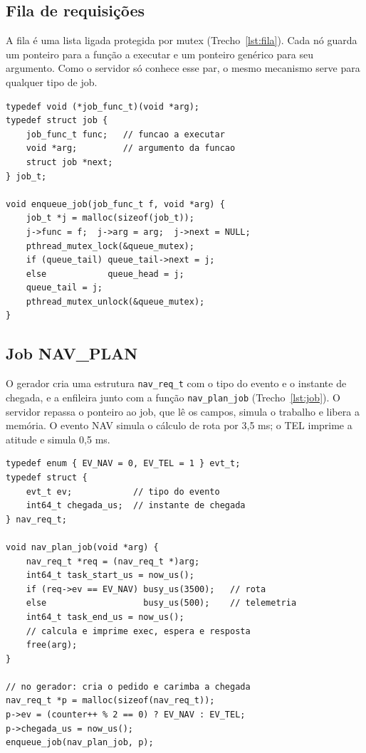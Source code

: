 \documentclass[conference,a4paper]{IEEEtran}
\begin{document}
\subsection{Fila de requisições}
A fila é uma lista ligada protegida por mutex (Trecho~\ref{lst:fila}). Cada nó guarda um ponteiro para a função a executar e um ponteiro genérico para seu argumento. Como o servidor só conhece esse par, o mesmo mecanismo serve para qualquer tipo de job.

\begin{lstlisting}[caption={Fila de jobs, do código de exemplo.},label={lst:fila}]
typedef void (*job_func_t)(void *arg);
typedef struct job {
    job_func_t func;   // funcao a executar
    void *arg;         // argumento da funcao
    struct job *next;
} job_t;

void enqueue_job(job_func_t f, void *arg) {
    job_t *j = malloc(sizeof(job_t));
    j->func = f;  j->arg = arg;  j->next = NULL;
    pthread_mutex_lock(&queue_mutex);
    if (queue_tail) queue_tail->next = j;
    else            queue_head = j;
    queue_tail = j;
    pthread_mutex_unlock(&queue_mutex);
}
\end{lstlisting}

\subsection{Job NAV\_PLAN}
O gerador cria uma estrutura \texttt{nav\_req\_t} com o tipo do evento e o instante de chegada, e a enfileira junto com a função \texttt{nav\_plan\_job} (Trecho~\ref{lst:job}). O servidor repassa o ponteiro ao job, que lê os campos, simula o trabalho e libera a memória. O evento NAV simula o cálculo de rota por 3,5 ms; o TEL imprime a atitude e simula 0,5 ms.

\begin{lstlisting}[caption={Argumento, job NAV\_PLAN e geração do pedido.},label={lst:job}]
typedef enum { EV_NAV = 0, EV_TEL = 1 } evt_t;
typedef struct {
    evt_t ev;            // tipo do evento
    int64_t chegada_us;  // instante de chegada
} nav_req_t;

void nav_plan_job(void *arg) {
    nav_req_t *req = (nav_req_t *)arg;
    int64_t task_start_us = now_us();
    if (req->ev == EV_NAV) busy_us(3500);   // rota
    else                   busy_us(500);    // telemetria
    int64_t task_end_us = now_us();
    // calcula e imprime exec, espera e resposta
    free(arg);
}

// no gerador: cria o pedido e carimba a chegada
nav_req_t *p = malloc(sizeof(nav_req_t));
p->ev = (counter++ % 2 == 0) ? EV_NAV : EV_TEL;
p->chegada_us = now_us();
enqueue_job(nav_plan_job, p);
\end{lstlisting}
\end{document}
